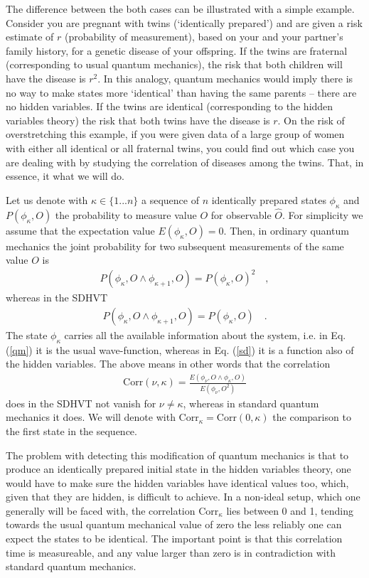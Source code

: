 \documentclass[12pt]{article}                    %
\newcommand{\beqn}{\begin{eqnarray}}
\newcommand{\eeqn}{\end{eqnarray}}
\begin{document}
The difference between the both cases can be illustrated with a simple example. Consider
you are pregnant with twins (`identically prepared') and are given a risk estimate of $r$ 
(probability of measurement), based on your and your partner's family 
history, for a genetic disease of your offspring. If the twins are fraternal (corresponding to usual quantum mechanics), the risk 
that both children will have the disease is $r^2$. In this analogy,
quantum mechanics would imply there is no way to make states more `identical' than having 
the same parents -- there are no hidden variables. If the twins are identical (corresponding to the hidden
variables theory) the risk that both twins have the disease is $r$. On the risk of overstretching this
example, if you were given data of a large group of women with either all identical or all fraternal twins, you could
find out which case you are dealing with by studying the correlation of diseases among the twins. 
That, in essence, it what we will do.

Let us denote with $\kappa \in \{1...n\}$ a sequence of $n$ identically prepared states $\phi_\kappa$ and $P(\phi_\kappa, O)$
the probability to measure value $O$ for observable $\hat O$. For simplicity we assume that
the expectation value  $E(\phi_\kappa,O) =0$. Then, in ordinary
quantum mechanics the joint probability for two subsequent measurements of the same value $O$ is
\beqn
P(\phi_\kappa, O \wedge \phi_{\kappa +1}, O) =  P(\phi_\kappa, O)^2 \quad, \label{qm}
\eeqn
whereas in the {\sc SDHVT}
\beqn
P(\phi_\kappa, O \wedge \phi_{\kappa +1}, O) = P(\phi_\kappa, O) \quad. \label{sd}
\eeqn
The state $\phi_\kappa$ carries all the available information about the system,
i.e. in Eq. (\ref{qm}) it is the usual wave-function, whereas in Eq. (\ref{sd}) it is a
function also of the hidden variables. The above means in other words that the correlation
\beqn
{\mathrm{Corr}}(\nu,\kappa) = \frac{E(\phi_{\nu}, O \wedge \phi_{\kappa}, O  )}{E(\phi_\nu, O^2)}
\eeqn
does in the {\sc SDHVT} not vanish for $\nu \neq \kappa$, whereas in standard quantum mechanics
it does. We will denote with ${\mathrm{Corr}}_\kappa = {\mathrm{Corr}}(0,\kappa)$ the
comparison to the first state in the sequence.


The problem with detecting this modification of quantum mechanics 
is that to produce an identically prepared initial state in the hidden variables theory, 
one would have to make sure the hidden variables have identical values too, which, 
given that they are hidden, is difficult to achieve. In a non-ideal setup, which
one generally will be faced with, the correlation ${\mathrm{Corr}}_\kappa$ lies between 0 and 1,
tending towards the usual quantum mechanical value of zero the less reliably one can
expect the states to be identical. The important point is that this correlation time is
measureable, and any value larger than zero is in contradiction with standard
quantum mechanics.
\end{document}

